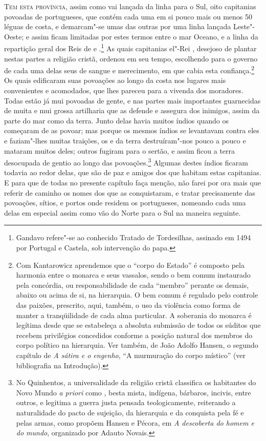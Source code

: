 \noindent\textsc{Tem esta província}, assim como vai lançada da linha  para o Sul,
oito capitanias povoadas de portugueses, que contém cada uma em si
pouco mais ou menos 50 léguas de costa, e demarcam"-se umas das
outras por uma linha lançada Leste"-Oeste; e assim ficam limitadas por
estes termos entre o mar Oceano, e a linha da repartição geral dos Reis
de  e .\footnote{ Gandavo refere"-se ao conhecido Tratado
de Tordesilhas, assinado em 1494 por Portugal e Castela, sob
intervenção do papa.} As quais capitanias el"-Rei ,		
desejoso de plantar nestas partes a religião cristã, ordenou em seu
tempo, escolhendo para o governo de cada uma delas  seus de
sangue e merecimento, em que cabia esta confiança.\footnote{ Com
Kantarowicz aprendemos que o ``corpo do
Estado'' é composto pela harmonia entre o monarca e seus
vassalos, sendo o bem comum instaurado pela concórdia, ou
responsabilidade de cada ``membro'' perante
os demais, abaixo ou acima de si, na hierarquia. O bem comum é regulado pelo
controle das paixões, prescrito, aqui, também, o uso da violência como
forma de manter a tranqüilidade de cada alma particular. A soberania do monarca é
legítima desde que se estabeleça a absoluta submissão de todos os súditos que recebem
privilégios concedidos conforme a posição natural dos membros do corpo
político na hierarquia. Ver também, de João Adolfo Hansen, o segundo
capítulo de \textit{A sátira e o engenho}, ``A murmuração
do corpo místico'' (ver bibliografia na Introdução).} Os quais 
edificaram suas povoações ao longo da costa nos lugares mais
convenientes e acomodados, que lhes pareceu para a vivenda dos
moradores. Todas estão já mui povoadas de gente, e nas partes mais
importantes guarnecidas de muita e mui grossa artilharia que as defende
e assegura dos inimigos, assim da parte do mar como da terra. Junto
delas havia muitos índios quando os  começaram de as			%
povoar; mas porque os mesmos índios se levantavam contra eles e
faziam"-lhes muitas traições, os  e  da terra
destruíram"-nos pouco a pouco e mataram muitos deles; outros fugiram
para o sertão, e assim ficou a terra desocupada de gentio ao longo das				%
povoações.\footnote{ No Quinhentos, a universalidade da religião cristã
classifica os habitantes do Novo Mundo \textit{a priori} como ,
besta mista, indígena, bárbaros, incivis, entre outros, e legitima a
guerra justa pensada  teologicamente, reiterando a naturalidade do
pacto de sujeição, da hierarquia e da conquista pela fé e pelas armas,
como propõem Hansen e Pécora, em \textit{A descoberta do homem e do
mundo}, organizado por Adauto Novais.}
 Algumas  destes índios									%
ficaram todavia ao redor delas, que são de paz e amigos dos 
que habitam estas capitanias. E para que de todas no presente capítulo
faça menção, não farei por ora mais que referir de caminho os nomes dos
 que as conquistaram, e tratar precisamente das
povoações, sítios, e portos onde residem os portugueses, nomeando cada
uma delas em especial assim como vão do Norte para o Sul na maneira seguinte.

